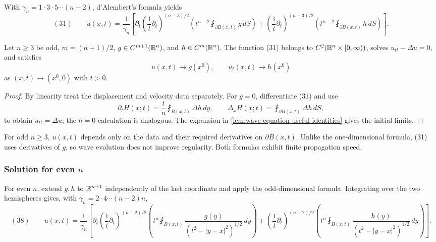 With $\gamma_n=1\cdot3\cdot5\cdots(n-2)$, d'Alembert's formula yields
$$(31)\qquad
u(x,t)=\frac1{\gamma_n}\left[
\partial_t\left(\frac1t\partial_t\right)^{(n-3)/2}
\left(t^{n-2}\fint_{\partial B(x,t)}g\,dS\right)
+\left(\frac1t\partial_t\right)^{(n-3)/2}
\left(t^{n-2}\fint_{\partial B(x,t)}h\,dS\right)
\right].$$

\begin{theorem}
\label{thm:wave-equation-odd-dimensions-solution}



Let $n\ge3$ be odd, $m=(n+1)/2$, $g\in C^{m+1}(\mathbb{R}^n)$, and
$h\in C^m(\mathbb{R}^n)$. The function (31) belongs to
$C^2(\mathbb{R}^n\times[0,\infty))$, solves $u_{tt}-\Delta u=0$, and satisfies
$$u(x,t)\to g(x^0),
\qquad
u_t(x,t)\to h(x^0)$$
as $(x,t)\to(x^0,0)$ with $t>0$.
\end{theorem}
\begin{proof}
\sketch By linearity treat the displacement and velocity data separately.
For $g=0$, differentiate (31) and use
$$\partial_tH(x;t)=\frac t n\fint_{B(x,t)}\Delta h\,dy,
\qquad
\Delta_xH(x;t)=\fint_{\partial B(x,t)}\Delta h\,dS,$$
to obtain $u_{tt}=\Delta u$; the $h=0$ calculation is analogous. The expansion
in \cref{lem:wave-equation-useful-identities} gives the initial limits.
\end{proof}

\begin{remark}
\label{rem:wave-equation-odd-dimension-remarks}

For odd $n\ge3$, $u(x,t)$ depends only on the data and their required
derivatives on $\partial B(x,t)$. Unlike the one-dimensional formula, (31)
uses derivatives of $g$, so wave evolution does not improve regularity. Both
formulas exhibit finite propagation speed.
\end{remark}

\subsubsection{Solution for even $n$}
\label{sec:wave-solution-even-n}

For even $n$, extend $g,h$ to $\mathbb{R}^{n+1}$ independently of the last coordinate
and apply the odd-dimensional formula. Integrating over the two hemispheres
gives, with $\gamma_n=2\cdot4\cdots(n-2)n$,
$$(38)\qquad
u(x,t)=\frac1{\gamma_n}\left[
\partial_t\left(\frac1t\partial_t\right)^{(n-2)/2}
\left(t^n\fint_{B(x,t)}
\frac{g(y)}{(t^2-|y-x|^2)^{1/2}}\,dy\right)
+\left(\frac1t\partial_t\right)^{(n-2)/2}
\left(t^n\fint_{B(x,t)}
\frac{h(y)}{(t^2-|y-x|^2)^{1/2}}\,dy\right)
\right].$$

